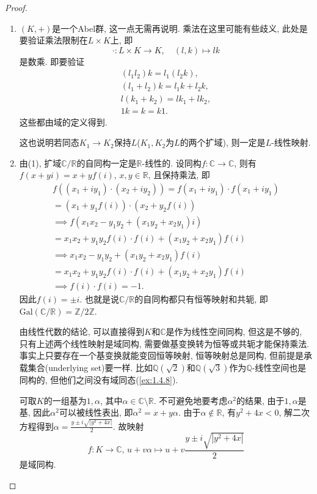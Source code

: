 \begin{proof}
    \begin{enumerate}[(1)]
        \item $(K, +)$是一个Abel群, 这一点无需再说明. 乘法在这里可能有些歧义, 此处是要验证乘法限制在$L \times K$上, 即
        \[
            \cdot: L \times K \to K, \quad (l, k) \mapsto lk
        \]
        是数乘. 即要验证
        \[
        \begin{gathered}
            (l_1l_2)k = l_1(l_2k),\\
            (l_1 + l_2)k = l_1k + l_2k,\\
            l(k_1 + k_2) = lk_1 + lk_2,\\
            1k = k = k1.
        \end{gathered}
        \]
        这些都由域的定义得到.
    
        这也说明若同态$K_1 \to K_2$保持$L$($K_1, K_2$为$L$的两个扩域), 则一定是$L$-线性映射.
        \item 由(1), 扩域$\mathbb{C}/\mathbb{R}$的自同构一定是$\mathbb{R}$-线性的. 设同构$f: \mathbb{C} \to \mathbb{C}$, 则有$f(x + yi) = x + yf(i),\, x, y \in \mathbb{R}$, 且保持乘法, 即
        \[
        \begin{gathered}
            f\left((x_1 + iy_1) \cdot (x_2 + iy_2)\right) = f(x_1 + iy_1) \cdot f(x_1 + iy_1)\\
            = (x_1 + y_1f(i)) \cdot (x_2 + y_2f(i))\\
            \implies f\left(x_1x_2 - y_1y_2 + (x_1y_2 +x_2y_1)i\right)\\
            = x_1x_2 + y_1y_2f(i) \cdot f(i) + (x_1y_2 +x_2y_1)f(i)\\
            \implies x_1x_2 - y_1y_2 + (x_1y_2 +x_2y_1)f(i)\\
            = x_1x_2 + y_1y_2f(i) \cdot f(i) + (x_1y_2 +x_2y_1)f(i)\\
            \implies f(i) \cdot f(i) = -1.
        \end{gathered}
        \]
        因此$f(i) = \pm i$. 也就是说$\mathbb{C}/\mathbb{R}$的自同构都只有恒等映射和共轭, 即$\mathrm{Gal}(\mathbb{C}/\mathbb{R}) = \mathbb{Z}/2\mathbb{Z}$.
        
        由线性代数的结论, 可以直接得到$K$和$\mathbb{C}$是作为线性空间同构, 但这是不够的, 只有上述两个线性映射是域同构, 需要做基变换转为恒等或共轭才能保持乘法. 事实上只要存在一个基变换就能变回恒等映射, 恒等映射总是同构, 但前提是承载集合(underlying set)要一样. 比如$\mathbb{Q}(\sqrt{2})$和$\mathbb{Q}(\sqrt{3})$作为$\mathbb{Q}$-线性空间也是同构的, 但他们之间没有域同态(\ref{ex:1.4.8}).
        
        可取$K$的一组基为$1, \alpha$, 其中$\alpha \in \mathbb{C} \setminus \mathbb{R}$. 不可避免地要考虑$\alpha^2$的结果, 由于$1, \alpha$是基, 因此$\alpha^2$可以被线性表出, 即$\alpha^2 = x + y\alpha$. 由于$\alpha \notin \mathbb{R}$, 有$y^2 + 4x < 0$, 解二次方程得到$\alpha = \frac{y \pm i\sqrt{|y^2 + 4x|}}{2}$. 故映射
        \[
            f: K \to \mathbb{C},\, u + v\alpha \mapsto u + v\frac{y \pm i\sqrt{|y^2 + 4x|}}{2}
        \]
        是域同构.
    \end{enumerate}
\end{proof}

